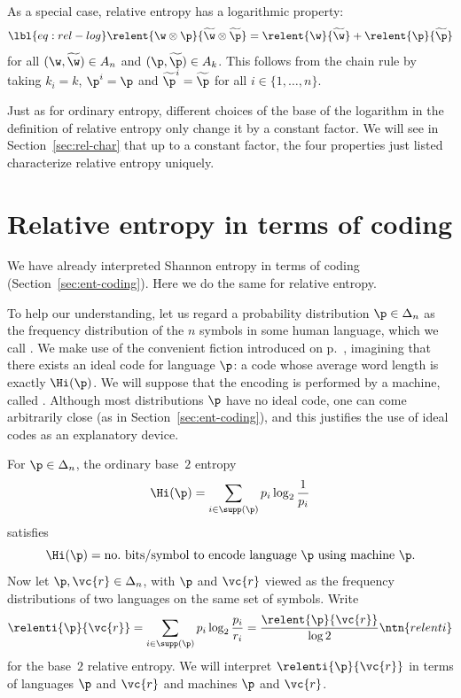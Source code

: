 \begin{description}
As a special case, relative entropy has a logarithmic property:
% 
\begin{equation}
\lbl{eq:rel-log}
\relent{\w \otimes \p}{\widetilde{\w} \otimes \widetilde{\p}}
=
\relent{\w}{\widetilde{\w}} + \relent{\p}{\widetilde{\p}}
\end{equation}
% 
for all $(\w, \widetilde{\w}) \in A_n$ and $(\p, \widetilde{\p}) \in A_k$.
This follows from the chain rule by taking $k_i = k$, $\p^i = \p$ and
$\widetilde{\p}^i = \widetilde{\p}$ for all $i \in \{1, \ldots, n\}$.  
\end{description}

Just as for ordinary entropy, different choices of the base of the
logarithm in the definition of relative entropy only change it by a
constant factor.  We will see in Section~\ref{sec:rel-char} that up to a
constant factor, the four properties just listed characterize relative
entropy uniquely.


\section{Relative entropy in terms of coding}

We have already interpreted Shannon entropy in terms of coding
(Section~\ref{sec:ent-coding}).  Here we do the same for relative entropy.  

To help our understanding, let us regard a probability distribution $\p \in
\Delta_n$ as the frequency distribution of the $n$ symbols in some human
language, which we call .  We make use of the convenient fiction introduced on
p.~\pageref{p:fiction}, imagining that there exists an ideal code for
language $\p$: a code whose average word length is exactly $\Hi(\p)$.  We
will suppose that the encoding is performed by a machine, called
.  Although most distributions $\p$ have no ideal code, one can come
arbitrarily close (as in Section~\ref{sec:ent-coding}), and this justifies
the use of ideal codes as an explanatory device.

For $\p \in \Delta_n$, the ordinary base~$2$ entropy
\[
\Hi(\p) = \sum_{i \in \supp(\p)} p_i \log_2 \frac{1}{p_i}
\]
satisfies
\[
\Hi(\p)
=
\text{no.\ bits/symbol to encode language } \p \text{ using machine } \p.
\]
Now let $\p, \vc{r} \in \Delta_n$, with $\p$ and $\vc{r}$ viewed as the
frequency distributions of two languages on the same set of symbols.  Write
\[
\relenti{\p}{\vc{r}}
=
\sum_{i \in \supp(\p)} p_i \log_2 \frac{p_i}{r_i}
=
\frac{\relent{\p}{\vc{r}}}{\log 2}
\ntn{relenti}
\]
for the base~$2$ relative entropy.  We will interpret
$\relenti{\p}{\vc{r}}$ in terms of languages $\p$ and $\vc{r}$ and machines
$\p$ and $\vc{r}$.

